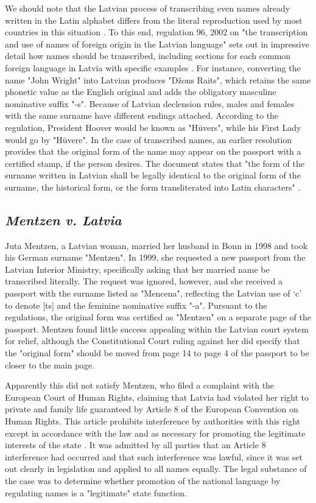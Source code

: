 We should note that the Latvian process of transcribing even names already
written in the Latin alphabet differs from the literal reproduction used by
most countries in this situation \parencite{varennes15}. To this end,
regulation 96, 2002 on "the transcription and use of names of foreign origin in
the Latvian language" sets out in impressive detail how names should be
transcribed, including sections for each common foreign language in Latvia with
specific examples \parencite{notei96}. For instance, converting the name "John
Wright" into Latvian produces "Džons Raits", which retains the same phonetic
value as the English original and adds the obligatory masculine nominative
suffix "-s". Because of Latvian declension rules, males and females with the
same surname have different endings attached. According to the regulation,
President Hoover would be known as "Hūvers", while his First Lady would go by
"Hūvere". In the case of transcribed names, an earlier resolution provides that
the original form of the name may appear on the passport with a certified
stamp, if the person desires. The document states that "the form of the surname
written in Latvian shall be legally identical to the original form of the
surname, the historical form, or the form transliterated into Latin
characters" \parencite{notei295}.

\subsection{\textit{Mentzen v. Latvia}}

Juta Mentzen, a Latvian woman, married her husband in Bonn in 1998 and took his
German surname "Mentzen". In 1999, she requested a new passport from the
Latvian Interior Ministry, specifically asking that her married name be
transcribed literally. The request was ignored, however, and she received a
passport with the surname listed as "Mencena", reflecting the Latvian use of
`c' to denote [ts] and the feminine nominative suffix "-a". Pursuant to the
regulations, the original form was certified as "Mentzen" on a separate page of
the passport. Mentzen found little success appealing within the Latvian court
system for relief, although the Constitutional Court ruling against her did
specify that the "original form" should be moved from page 14 to page 4 of the
passport to be closer to the main page.

Apparently this did not satisfy Mentzen, who filed a complaint with the
European Court of Human Rights, claiming that Latvia had violated her right to
private and family life guaranteed by Article 8 of the European Convention on
Human Rights. This article prohibits interference by authorities with this
right except in accordance with the law and as necessary for promoting the
legitimate interests of the state \parencite{echr}. It was admitted by all
parties that an Article 8 interference had occurred and that such interference
was lawful, since it was set out clearly in legislation and applied to all
names equally. The legal substance of the case was to determine whether
promotion of the national language by regulating names is a "legitimate" state
function.

